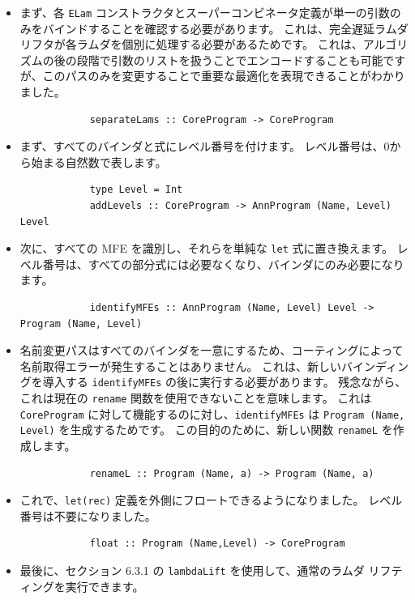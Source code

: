 \documentclass{jbook}
\begin{document}
\begin{itemize}
	\item まず、各 \texttt{ELam} コンストラクタとスーパーコンビネータ定義が単一の引数のみをバインドすることを確認する必要があります。
	      これは、完全遅延ラムダリフタが各ラムダを個別に処理する必要があるためです。
	      これは、アルゴリズムの後の段階で引数のリストを扱うことでエンコードすることも可能ですが、このパスのみを変更することで重要な最適化を表現できることがわかりました。
	      \begin{verbatim}
			separateLams :: CoreProgram -> CoreProgram
		  \end{verbatim}
	\item まず、すべてのバインダと式にレベル番号を付けます。
	      レベル番号は、0から始まる自然数で表します。
	      \begin{verbatim}
			type Level = Int
			addLevels :: CoreProgram -> AnnProgram (Name, Level) Level
		  \end{verbatim}
	\item 次に、すべての MFE を識別し、それらを単純な \texttt{let} 式に置き換えます。
	      レベル番号は、すべての部分式には必要なくなり、バインダにのみ必要になります。
	      \begin{verbatim}
			identifyMFEs :: AnnProgram (Name, Level) Level -> Program (Name, Level)
		  \end{verbatim}
	\item 名前変更パスはすべてのバインダを一意にするため、コーティングによって名前取得エラーが発生することはありません。
	      これは、新しいバインディングを導入する \texttt{identifyMFEs} の後に実行する必要があります。
	      残念ながら、これは現在の \texttt{rename} 関数を使用できないことを意味します。
	      これは \texttt{CoreProgram} に対して機能するのに対し、\texttt{identifyMFEs} は \texttt{Program (Name, Level)} を生成するためです。
	      この目的のために、新しい関数 \texttt{renameL} を作成します。
	      \begin{verbatim}
			renameL :: Program (Name, a) -> Program (Name, a)
		  \end{verbatim}
	\item これで、\texttt{let(rec)} 定義を外側にフロートできるようになりました。
	      レベル番号は不要になりました。
	      \begin{verbatim}
			float :: Program (Name,Level) -> CoreProgram
		  \end{verbatim}
	\item 最後に、セクション 6.3.1 の \texttt{lambdaLift} を使用して、通常のラムダ リフティングを実行できます。
\end{itemize}
\end{document}
